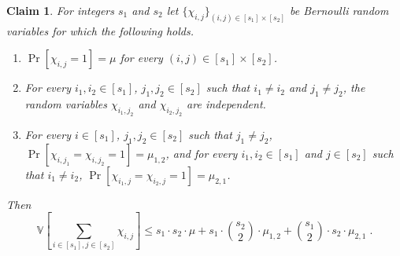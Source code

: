 \documentclass{article}
\newcommand{\Var}{\mathbb{V}}
\newtheorem{claim}[lemma]{Claim}
\newcommand{\commentt}[1]{ {}}
\begin{document}

\begin{claim}\label{clm:var1}
For integers $s_1$ and $s_2$  let
$\{\chi_{i,j}\}_{(i,j)\in [s_1]\times [s_2]}$ be Bernoulli random variables for which the following holds.
\begin{enumerate}
\item  $\Pr[\chi_{i,j} = 1] = \mu$ for every $(i,j)\in [s_1]\times [s_2]$.
\item For every $i_1,i_2 \in [s_1]$, $j_1,j_2\in [s_2]$ such that $i_1\neq i_2$ and $j_1\neq j_2$,
the random variables $\chi_{i_1,j_2}$ and $\chi_{i_2,j_2}$ are independent.
\item For every $i\in [s_1]$, $j_1,j_2\in [s_2]$ such that  $j_1\neq j_2$,
$\Pr[\chi_{i,j_1}=\chi_{i,j_2} = 1] = \mu_{1,2}$, and for every $i_1,i_2 \in [s_1]$ and $j \in [s_2]$ such that $i_1\neq i_2$,  $\Pr[\chi_{i_1,j}=\chi_{i_2,j} = 1] = \mu_{2,1}$.
\end{enumerate}
Then
$$\Var\left[\sum_{i\in [s_1],j\in [s_2]}\chi_{i,j}\right] \leq s_1\cdot s_2 \cdot \mu + s_1\cdot {s_2\choose 2}\cdot \mu_{1,2} + {s_1\choose 2} \cdot s_2\cdot \mu_{2,1}\;.$$
\end{claim}
\end{document}
